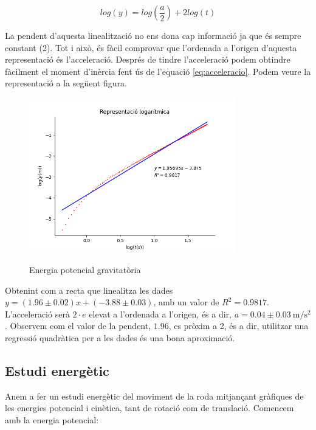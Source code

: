 \documentclass[11pt]{article}
\begin{document}
    \begin{equation}
        log(y)=log(\frac{a}{2})+2log(t)
    \end{equation}
    
    La pendent d'aquesta linealització no ens dona cap informació ja que és sempre constant (2). Tot i això, és fàcil comprovar que l'ordenada a l'origen d'aquesta representació és l'acceleració. Després de tindre l'acceleració podem obtindre fàcilment el moment d'inèrcia fent ús de l'equació \ref{eq:acceleracio}. Podem veure la representació a la següent figura.

    \begin{figure}[h]
        \vspace{-0.2cm}
        \begin{center}
            \includegraphics[width=0.8\textwidth]{fotos/log.png}
            \label{fig:log}
            \caption{Energia potencial gravitatòria}
        \end{center}
    \end{figure}

    Obtenint com a recta que linealitza les dades $y = (1.96 \pm 0.02)x + (-3.88 \pm 0.03)$, amb un valor de $R^2 = 0.9817$. L'acceleració serà $2\cdot e$ elevat a l'ordenada a l'origen, és a dir, $a=0.04\pm0.03\ \si{\meter}/\si{\second}^2$. Observem com el valor de la pendent, $1.96$, es pròxim a 2, és a dir, utilitzar una regressió quadràtica per a les dades és una bona aproximació.

    \clearpage
    \subsection{Estudi energètic}
    Anem a fer un estudi energètic del moviment de la roda mitjançant gràfiques de les energies potencial i cinètica, tant de rotació com de translació. Comencem amb la energia potencial:
\end{document}
